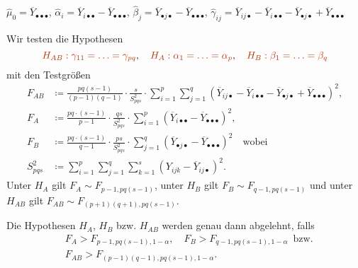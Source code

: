 \documentclass{cheat-sheet}
\newcommand{\testh}[1]{\textcolor{TestColor}{\textbf{#1}}}
\begin{document}
\begin{nota}
  $\hat{\mu}_0 = \overline{Y}_{\bullet \bullet \bullet}$, \enspace
  $\hat{\alpha}_i = \overline{Y}_{i \bullet \bullet} - \overline{Y}_{\bullet \bullet \bullet}$, \enspace
  $\hat{\beta}_j = \overline{Y}_{\bullet j \bullet} - \overline{Y}_{\bullet \bullet \bullet}$, \enspace
  $\hat{\gamma}_{ij} = \overline{Y}_{ij \bullet} - \overline{Y}_{i \bullet \bullet} - \overline{Y}_{\bullet j \bullet} + \overline{Y}_{\bullet \bullet \bullet}$
\end{nota}

\begin{test}
  Wir testen die Hypothesen
  \[
    \text{\testh{$H_{AB} : \gamma_{11} = \ldots = \gamma_{pq}$}}, \quad
    \text{\testh{$H_A : \alpha_1 = \ldots = \alpha_p$}}, \quad
    \text{\testh{$H_B : \beta_1 = \ldots = \beta_q$}}
  \]
  mit den Testgrößen
  \begin{align*}
    F_{AB} & \coloneqq \frac{pq (s-1)}{(p-1)(q-1)} \cdot \frac{s}{S_{pqs}^2} \cdot \sum_{i=1}^p \sum_{j=1}^q (\overline{Y}_{i j \bullet} - \overline{Y}_{i \bullet \bullet} - \overline{Y}_{\bullet j \bullet} + \overline{Y}_{\bullet \bullet \bullet})^2, \\
    F_A & \coloneqq \frac{pq \cdot (s-1)}{p-1} \cdot \frac{qs}{S_{pqs}^2} \cdot \sum_{i=1}^p (\overline{Y}_{i \bullet \bullet} - \overline{Y}_{\bullet \bullet \bullet})^2, \\
    F_B & \coloneqq \frac{pq \cdot (s-1)}{q-1} \cdot \frac{ps}{S_{pqs}^2} \cdot \sum_{j=1}^q (\overline{Y}_{\bullet j \bullet} - \overline{Y}_{\bullet \bullet \bullet})^2 \quad \text{wobei} \\
    S_{pqs}^2 & \coloneqq \sum_{i=1}^p \sum_{j=1}^q \sum_{k=1}^s (Y_{ijk} - \overline{Y}_{i j \bullet})^2.
  \end{align*}
  Unter $H_A$ gilt $F_A \sim F_{p-1,pq(s-1)}$,
  unter $H_B$ gilt $F_B \sim F_{q-1,pq(s-1)}$ und
  unter $H_{AB}$ gilt $F_{AB} \sim F_{(p+1)(q+1), pq(s-1)}$.
\end{test}

\begin{entscheidungsregel}
  Die Hypothesen $H_A$, $H_B$ bzw. $H_{AB}$ werden genau dann abgelehnt, falls
  \begin{align*}
    & F_A > F_{p-1,pq(s-1),1-\alpha}, \quad
    F_B > F_{q-1,pq(s-1),1-\alpha}
    \enspace \text{bzw.} \\
    & F_{AB} > F_{(p-1)(q-1),pq(s-1),1-\alpha}.
  \end{align*}
\end{entscheidungsregel}
\end{document}
